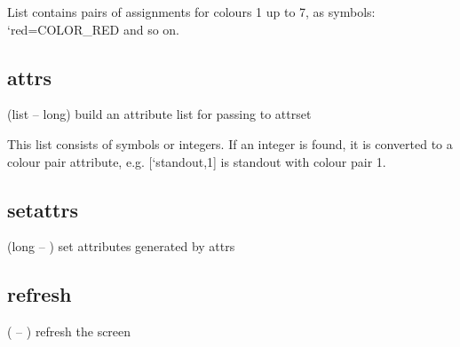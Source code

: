 List contains pairs of assignments for colours 1 up to 7,
as symbols: `red=COLOR_RED and so on.
\subsection{attrs}
(list -- long) build an attribute list for passing to attrset

This list consists of symbols or integers. If an integer is found, it
is converted to a colour pair attribute, e.g. [`standout,1] is standout
with colour pair 1.
\subsection{setattrs}
(long -- ) set attributes generated by attrs


\subsection{refresh}
( -- ) refresh the screen


